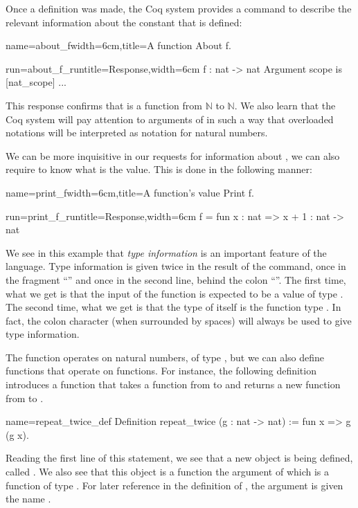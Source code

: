 Once a definition was made, the Coq system provides a command to
describe the relevant information about the constant that is defined:

\begin{coq}{name=about_f}{width=6cm,title=A function}
About f.
\end{coq}
\begin{coqout}{run=about_f_run}{title=Response,width=6cm}
f : nat -> nat
Argument scope is [nat_scope] ...
\end{coqout}
This response confirms that  is a function from
\({\mathbb{N}}\) to \({\mathbb{N}}\).
We also learn that the Coq system will pay attention to
arguments of  in such a way that overloaded notations
will be interpreted as notation for natural numbers.

We can be more inquisitive in our requests for information about
, we can also require to know what is the value.  This is done in
the following manner:

\begin{coq}{name=print_f}{width=6cm,title=A function's value}
Print f.
\end{coq}
\begin{coqout}{run=print_f_run}{title=Response,width=6cm}
f = fun x : nat => x + 1
       : nat -> nat
\end{coqout}

We see in this example that {\em type information} is an important
feature of the language.  Type information is given twice in the
result of the  command, once in the fragment ``'' and once in the second line, behind the colon ``\C{:}''.  The first
time, what we get is that the input of the function is expected to be
a value of type .  The second time, what we get is that the
type of  itself is the function type .  In fact,
the colon character (when surrounded by spaces) will always be used to
give type information.

The function  operates on natural numbers, of type , but
we can also define functions that operate on functions.  For instance,
the following definition introduces a function that takes a function
from  to  and returns a new function from  to
.

\begin{coq}{name=repeat_twice_def}{}
Definition repeat_twice (g : nat -> nat) :=
  fun x => g (g x).
\end{coq}
Reading the first line of this statement, we see that a new object is
being defined, called .  We also see that this object
is a function the argument of which is a function of
type .  For later reference in the definition of
, the argument is given the name .

